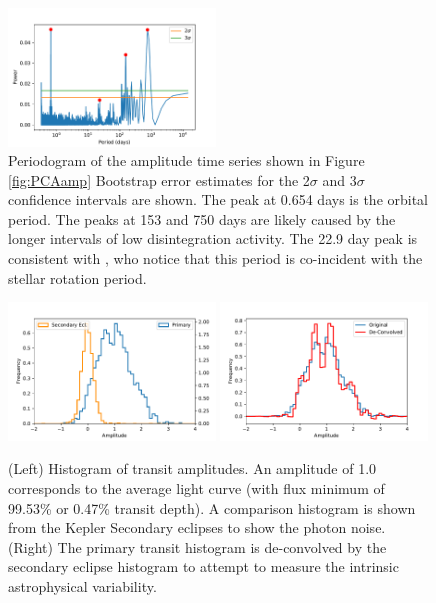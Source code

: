\documentclass[preprint]{aastex61}
\begin{document}
\begin{figure}[!hbtp]
\begin{centering}
\includegraphics[width=0.49\textwidth]{images/kepler/amplitude_periodogram.pdf}
\caption{Periodogram of the amplitude time series shown in Figure \ref{fig:PCAamp}
Bootstrap error estimates for the 2$\sigma$ and 3$\sigma$ confidence intervals are shown.
The peak at 0.654 days is the orbital period.
The peaks at 153 and 750 days are likely caused by the longer intervals of low disintegration activity.
The 22.9 day peak is consistent with \citet{kawahara2013starspots}, who notice that this period is co-incident with the stellar rotation period.}\label{fig:ampPeriodogram}
\end{centering}
\end{figure}

\begin{figure}[!hbtp]
\begin{centering}
\includegraphics[width=0.49\textwidth]{images/kepler/amplitude_histogram.pdf}
\includegraphics[width=0.49\textwidth]{images/kepler/deconvolved_hist.pdf}
\caption{(Left) Histogram of transit amplitudes.
An amplitude of 1.0 corresponds to the average light curve (with flux minimum of 99.53\% or 0.47\% transit depth).
A comparison histogram is shown from the Kepler Secondary eclipses to show the photon noise.
(Right) The primary transit histogram is de-convolved by the secondary eclipse histogram to attempt to measure the intrinsic astrophysical variability.}\label{fig:histograms}
\end{centering}
\end{figure}
\end{document}
